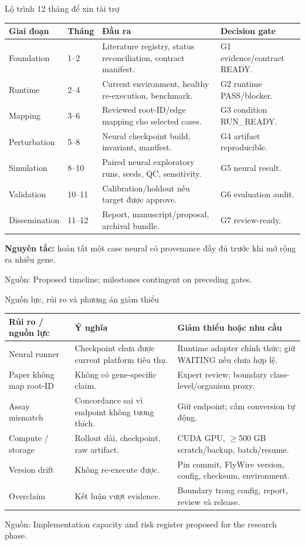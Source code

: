 \documentclass[10pt,aspectratio=169]{beamer}
\newcommand{\hi}[1]{\textcolor{greenteal}{\textbf{#1}}}
\newcommand{\source}[1]{\par\vfill{\fontsize{6.0}{7}\selectfont\color{gray}Nguồn: #1\par}}
\newcommand{\smallgap}{\vspace{0.18cm}}
\begin{document}
\begin{frame}{Lộ trình 12 tháng để xin tài trợ}
\renewcommand{\arraystretch}{1.12}\scriptsize
\begin{tabular}{@{}L{2.1cm}L{1.1cm}L{7.0cm}L{4.1cm}@{}}
\toprule
\textbf{Giai đoạn} & \textbf{Tháng} & \textbf{Đầu ra} & \textbf{Decision gate}\\\midrule
Foundation & 1--2 & Literature registry, status reconciliation, contract manifest. & G1 evidence/contract READY.\\
Runtime & 2--4 & Current environment, healthy re-execution, benchmark. & G2 runtime PASS/blocker.\\
Mapping & 3--6 & Reviewed root-ID/edge mapping cho selected cases. & G3 condition RUN\_READY.\\
Perturbation & 5--8 & Neural checkpoint build, invariant, manifest. & G4 artifact reproducible.\\
Simulation & 8--10 & Paired neural exploratory runs, seeds, QC, sensitivity. & G5 neural result.\\
Validation & 10--11 & Calibration/holdout nếu target được approve. & G6 evaluation audit.\\
Dissemination & 11--12 & Report, manuscript/proposal, archival bundle. & G7 review-ready.\\\bottomrule
\end{tabular}
\smallgap
\hi{Nguyên tắc:} hoàn tất một case neural có provenance đầy đủ trước khi mở rộng ra nhiều gene.
\source{Proposed timeline; milestones contingent on preceding gates.}
\end{frame}

\begin{frame}{Nguồn lực, rủi ro và phương án giảm thiểu}
\renewcommand{\arraystretch}{1.18}\scriptsize
\begin{tabular}{@{}L{3.4cm}L{4.4cm}L{6.5cm}@{}}
\toprule
\textbf{Rủi ro / nguồn lực} & \textbf{Ý nghĩa} & \textbf{Giảm thiểu hoặc nhu cầu}\\\midrule
Neural runner & Checkpoint chưa được current platform tiêu thụ. & Runtime adapter chính thức; giữ WAITING nếu chưa hợp lệ.\\
Paper không map root-ID & Không có gene-specific claim. & Expert review; boundary class-level/organism proxy.\\
Assay mismatch & Concordance sai vì endpoint không tương thích. & Giữ endpoint; cấm conversion tự động.\\
Compute / storage & Rollout dài, checkpoint, raw artifact. & CUDA GPU, $\geq$500 GB scratch/backup, batch/resume.\\
Version drift & Không re-execute được. & Pin commit, FlyWire version, config, checksum, environment.\\
Overclaim & Kết luận vượt evidence. & Boundary trong config, report, review và release.\\\bottomrule
\end{tabular}
\source{Implementation capacity and risk register proposed for the research phase.}
\end{frame}
\end{document}
